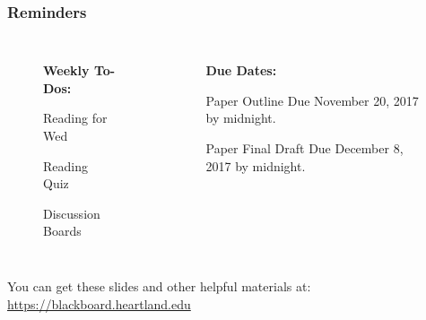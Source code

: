 \documentclass[12pt,presentation,notes]{beamer}
\begin{document}
\begin{frame}
\frametitle{Reminders}
\begin{columns}

\begin{figure}[HT]
\textbf{Weekly To-Dos:}

\begin{block}{}Reading for Wed    \end{block}
\begin{block}{}Reading Quiz       \end{block}
\begin{block}{}Discussion Boards  \end{block}

\end{figure}


\begin{figure}[HT]
\textbf{Due Dates:}

\begin{block}{Paper Outline}
	Due November 20, 2017 by midnight.
\end{block}
\begin{block}{Paper Final Draft}
	Due December 8, 2017 by midnight.
\end{block}

\end{figure}
\end{columns}

\vspace{0.5cm}

You can get these slides and other helpful materials at: \url{https://blackboard.heartland.edu}

\end{frame}
\end{document}
